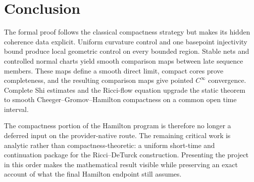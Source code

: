 \documentclass[11pt]{article}
\theoremstyle{plain}
\theoremstyle{definition}
\theoremstyle{remark}
\begin{document}
\section{Conclusion}

The formal proof follows the classical compactness strategy but makes its
hidden coherence data explicit.  Uniform curvature control and one
basepoint injectivity bound produce local geometric control on every bounded
region.  Stable nets and controlled normal charts yield smooth comparison
maps between late sequence members.  These maps define a smooth direct
limit, compact cores prove completeness, and the resulting comparison maps
give pointed \(C^\infty\) convergence.  Complete Shi estimates and the
Ricci-flow equation upgrade the static theorem to smooth
Cheeger--Gromov--Hamilton compactness on a common open time interval.

The compactness portion of the Hamilton program is therefore no longer a
deferred input on the provider-native route.  The remaining critical work is
analytic rather than compactness-theoretic: a uniform short-time and
continuation package for the Ricci--DeTurck construction.  Presenting the
project in this order makes the mathematical result visible while preserving
an exact account of what the final Hamilton endpoint still assumes.



\end{document}
